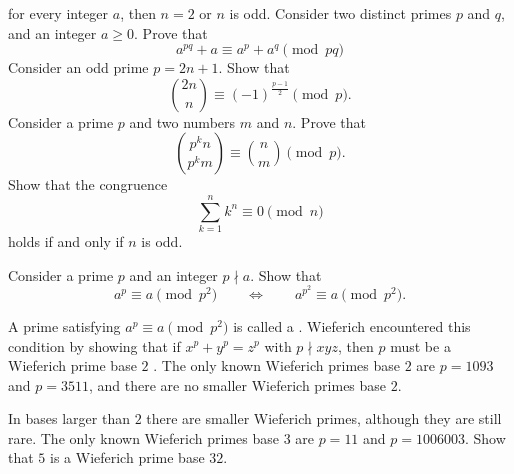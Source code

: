 \begin{routine}
  for every integer $a$, then $n=2$ or $n$ is odd.
  \exercise Consider two distinct primes $p$ and $q$, and an integer $a\geq 0$. Prove that
  \begin{equation*}
    a^{pq}+a\equiv a^p + a^q \pmod{pq}
  \end{equation*}
  \exercise Consider an odd prime $p=2n+1$. Show that
  \begin{equation*}
    \binom{2n}{n}\equiv (-1)^{\frac{p-1}{2}}\pmod{p}.
  \end{equation*}
  \exercise Consider a prime $p$ and two numbers $m$ and $n$. Prove that
  \begin{equation*}
    \binom{p^kn}{p^km}\equiv \binom{n}{m}\pmod{p}.
  \end{equation*}
  \exercise Show that the congruence
  \begin{equation*}
    \sum_{k=1}^{n} k^n\equiv 0\pmod{n}
  \end{equation*}
  holds if and only if $n$ is odd.
  \exercise
  \begin{subexenum}
  \item Consider a prime $p$ and an integer $p\nmid a$. Show that
    \begin{equation*}
      a^p\equiv a\pmod{p^2}\qquad\Leftrightarrow \qquad a^{p^2}\equiv a\pmod{p^2}.
    \end{equation*}
  \item A prime satisfying $a^p\equiv a\pmod{p^2}$ is called a . Wieferich encountered this condition by showing that if $x^p+y^p=z^p$ with $p\nmid xyz$, then $p$ must be a Wieferich prime base $2$ \cite{wieferich1909}. The only known Wieferich primes base $2$ are $p=1093$ and $p=3511$, and there are no smaller Wieferich primes base $2$.
    
    In bases larger than $2$ there are smaller Wieferich primes, although they are still rare. The only known Wieferich primes base $3$ are $p=11$ and $p=1006003$. Show that $5$ is a Wieferich prime base $32$.
  \end{subexenum}
\end{routine}


